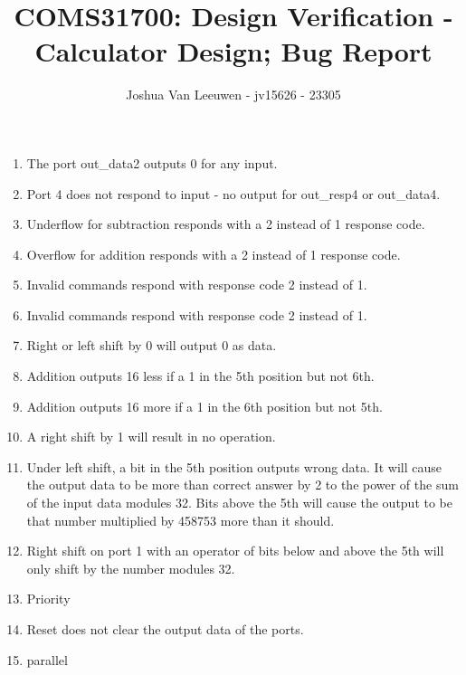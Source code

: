 \documentclass[a4paper]{article}
\title{\vspace{-0.7em}COMS31700: Design Verification - Calculator Design; Bug Report\vspace{-0.7em}}
\author{Joshua Van Leeuwen - jv15626 - 23305}
\date{}
\begin{document}
\vspace{-10em}
\maketitle

\vspace{-5.1em}
\begin{enumerate}
    \item The port out\_data2 outputs 0 for any input.
    \item Port 4 does not respond to input - no output for out\_resp4 or out\_data4.
    \item Underflow for subtraction responds with a 2 instead of 1 response code.
    \item Overflow for addition responds with a 2 instead of 1 response code.
    \item Invalid commands respond with response code 2 instead of 1.
    \item Invalid commands respond with response code 2 instead of 1.
    \item Right or left shift by 0 will output 0 as data.
    \item Addition outputs 16 less if a 1 in the 5th position but not 6th.
    \item Addition outputs 16 more if a 1 in the 6th position but not 5th.
    \item A right shift by 1 will result in no operation.
    \item Under left shift, a bit in the 5th position outputs wrong data. It will cause the output data to be more than correct answer by 2 to the power of the sum of the input data modules 32. Bits above the 5th will cause the output to be that number multiplied by 458753 more than it should.
    \item Right shift on port 1 with an operator of bits below and above the 5th will only shift by the number modules 32.
    \item Priority
    \item Reset does not clear the output data of the ports.
    \item parallel
\end{enumerate}
\end{document}
